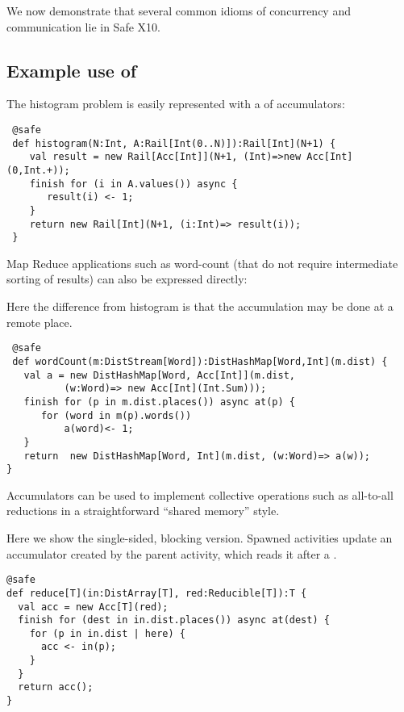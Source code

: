 We now demonstrate that several common idioms of concurrency and
communication lie in Safe X10.

\subsection{Example use of }
\begin{example}[Histogram]
The histogram problem is easily represented with a  of
accumulators: 
\begin{lstlisting}
 @safe
 def histogram(N:Int, A:Rail[Int(0..N)]):Rail[Int](N+1) {
    val result = new Rail[Acc[Int]](N+1, (Int)=>new Acc[Int](0,Int.+));
    finish for (i in A.values()) async {
       result(i) <- 1;
    }
    return new Rail[Int](N+1, (i:Int)=> result(i));
 }
\end{lstlisting}
\end{example}

Map Reduce applications such as word-count (that do not require
intermediate sorting of results) can also be expressed directly:
\begin{example}
Here the difference from histogram is that the accumulation may be
done at a remote place. 
\begin{lstlisting}
 @safe
 def wordCount(m:DistStream[Word]):DistHashMap[Word,Int](m.dist) {
   val a = new DistHashMap[Word, Acc[Int]](m.dist,
          (w:Word)=> new Acc[Int](Int.Sum)));
   finish for (p in m.dist.places()) async at(p) {
      for (word in m(p).words())
          a(word)<- 1;
   }
   return  new DistHashMap[Word, Int](m.dist, (w:Word)=> a(w));
}
\end{lstlisting}

\end{example}


Accumulators can be used to implement collective operations such as
all-to-all reductions in a straightforward ``shared memory'' style.

\begin{example}
Here we show the single-sided, blocking version. Spawned activities
update an accumulator created by the parent activity, which reads it
after a . 
  \begin{lstlisting}
@safe
def reduce[T](in:DistArray[T], red:Reducible[T]):T {
  val acc = new Acc[T](red);
  finish for (dest in in.dist.places()) async at(dest) {
    for (p in in.dist | here) {
      acc <- in(p);
    }
  }
  return acc();
}
\end{lstlisting}
\end{example}

